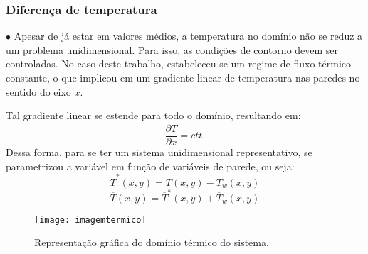 \documentclass[xcolor=dvipsnames,10pt,aspectratio=169]{beamer}
\begin{document}
		\begin{frame}
			\frametitle{Diferença de temperatura}
			$\bullet$ Apesar de já estar em valores médios, a temperatura no domínio não se reduz a um problema unidimensional. Para isso, as condições de contorno devem ser controladas. No caso deste trabalho, estabeleceu-se um regime de fluxo térmico constante, o que implicou em um gradiente linear de temperatura nas paredes no sentido do eixo $x$.  \\
			\begin{minipage}[h!]{0.36\textwidth}
				Tal gradiente linear se estende para todo o domínio, resultando em:
				\begin{equation}
				\frac{\partial \overline{T}}{\partial x} = ctt.
				\end{equation}
				Dessa forma, para se ter um sistema unidimensional representativo, se parametrizou a variável em função de variáveis de parede, ou seja:
				\begin{equation}
				\overline{T}^\ast(x , y) = \overline{T}(x,y)  - \overline{T}_w(x , y) 
				\end{equation}
				\begin{equation}
				\overline{T}(x,y) = \overline{T}^\ast(x , y) + \overline{T}_w(x , y)
				\end{equation}
			\end{minipage}\hfill
			\begin{minipage}[h!]{0.60\textwidth}
			\begin{figure}
				\centering
				\texttt{[image: imagemtermico]}
				\caption{Representação gráfica do domínio térmico do sistema.}
				\label{temperatura}
			\end{figure}
			\end{minipage}
		\end{frame}
		
		
		
		
		
\end{document}
